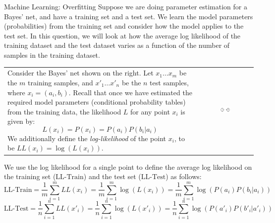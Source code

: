\begin{problem}[10]{Machine Learning: Overfitting}
Suppose we are doing parameter estimation for a Bayes' net, and have a training set and a test set. We learn the model parameters (probabilities) from the training set and consider how the model applies to the test set. In this question, we will look at how the average log likelihood of the training dataset and the test dataset varies as a function of the number of samples in the training dataset.

\begin{tabular}{@{}l@{}l@{}}
\begin{minipage}{0.75\textwidth}
Consider the Bayes' net shown on the right. Let $x_{1} \dots
x_{m}$ be the $m$ training samples, and $x'_{1} \ldots x'_{n}$
be the $n$ test samples, where $x_i = (a_i, b_i)$.
Recall that once we have estimated the required
model parameters (conditional probability tables) from the training data, the likelihood $L$
for any point $x_i$ is given by:
$$L(x_i) = P\left(x_i\right) = P(a_i)P(b_i|a_i) $$
We additionally define the \emph{log-likelihood} of the point $x_i$, to be $LL(x_i) = \log(L(x_i))$.
\end{minipage} &
\begin{minipage}{0.25\textwidth}
\begin{figure}[H]
\centering
    \includegraphics[width=1.0\textwidth]{figures/ml-tr-bayesnet.pdf}
\end{figure}
\end{minipage}\\
\end{tabular}


We use the log likelihood for a single point to define the average log likelihood on the training set ($\mbox{LL-Train}$) and the test set ($\mbox{LL-Test}$) as follows:
$$ \text{LL-Train} = \frac{1}{m}\sum_{i=1}^{m} LL(x_{i}) = \frac{1}{m}\sum_{i=1}^{m} \log\left(L(x_{i})\right) = \frac{1}{m}\sum_{i=1}^{m}\log\left(P(a_{i})P(b_{i}|a_{i})\right) $$
$$ \text{LL-Test} = \frac{1}{n}\sum_{i=1}^{n} LL(x'_{i}) = \frac{1}{n}\sum_{i=1}^{n} \log\left(L(x'_{i})\right) = \frac{1}{n}\sum_{i=1}^{n}\log\left(P(a'_{i})P(b'_{i}|a'_{i})\right) $$


\end{problem}
